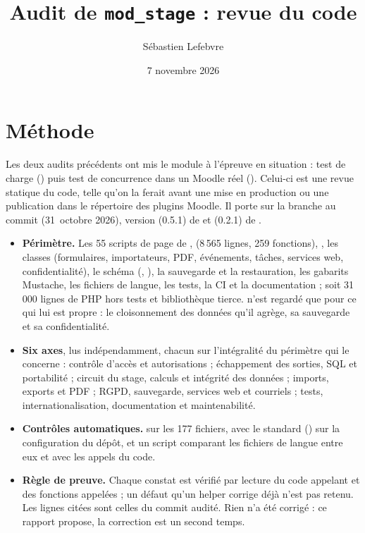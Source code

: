 \documentclass[11pt,a4paper]{article}
\title{Audit de \texttt{mod\_stage} : revue du code}
\author{Sébastien Lefebvre}
\date{7 novembre 2026}
\begin{document}
\maketitle

\section{Méthode}

Les deux audits précédents ont mis le module à l'épreuve en situation : test de charge
() puis test de concurrence dans un Moodle réel
(). Celui-ci est une revue statique du code, telle qu'on la ferait
avant une mise en production ou une publication dans le répertoire des plugins Moodle. Il porte
sur la branche  au commit  (31~octobre 2026), version
 (0.5.1) de  et  (0.2.1) de
.

\begin{itemize}
  \item \textbf{Périmètre.} Les 55 scripts de page de , 
    (8\,565 lignes, 259 fonctions), , les classes (formulaires, importateurs,
    PDF, événements, tâches, services web, confidentialité), le schéma (,
    ), la sauvegarde et la restauration, les gabarits Mustache, les fichiers de
    langue, les tests, la CI et la documentation ; soit 31\,000 lignes de PHP hors tests et
    bibliothèque tierce.  n'est regardé que pour ce qui lui est propre :
    le cloisonnement des données qu'il agrège, sa sauvegarde et sa confidentialité.
  \item \textbf{Six axes}, lus indépendamment, chacun sur l'intégralité du périmètre qui le
    concerne : contrôle d'accès et autorisations ; échappement des sorties, SQL et portabilité ;
    circuit du stage, calculs et intégrité des données ; imports, exports et PDF ; RGPD,
    sauvegarde, services web et courriels ; tests, internationalisation, documentation et
    maintenabilité.
  \item \textbf{Contrôles automatiques.}  sur les 177 fichiers,  avec
    le standard  () sur la configuration du dépôt, et un
    script comparant les fichiers de langue entre eux et avec les appels du code.
  \item \textbf{Règle de preuve.} Chaque constat est vérifié par lecture du code appelant et des
    fonctions appelées ; un défaut qu'un helper corrige déjà n'est pas retenu. Les lignes citées
    sont celles du commit audité. Rien n'a été corrigé : ce rapport propose, la correction est un
    second temps.
\end{itemize}
\end{document}
